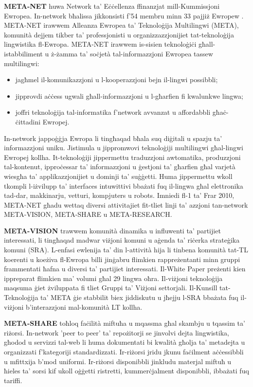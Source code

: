 \begin{multicols}{2}

\textbf{META-NET} huwa Network ta’ Eċċellenza ffinanzjat mill-Kummissjoni Ewropea. In-network bħalissa jikkonsisti f’54 membru minn 33 pajjiż Ewropew \cite{rehm2011}. META-NET irawwem Alleanza Ewropea ta’ Teknoloġija Multilingwi (META), komunità dejjem tikber ta’ professjonisti u organizzazzjonijiet tat-teknoloġija lingwistika fl-Ewropa. META-NET irawwem is-sisien teknoloġiċi għall-istabbiliment u ż-żamma ta’ soċjetà tal-informazzjoni Ewropea tassew multilingwi:

\begin{itemize}
\item jagħmel il-komunikazzjoni u l-kooperazzjoni bejn il-lingwi possibbli;
\item jipprovdi aċċess ugwali għall-informazzjoni u l-għarfien fi kwalunkwe lingwa;
\item joffri teknoloġija tal-informatika f’network avvanzat u affordabbli  għaċ-ċittadini Ewropej.  
\end{itemize}

In-network jappoġġja Ewropa li tingħaqad bħala suq diġitali u spazju ta’ informazzjoni uniku. Jistimula u jippromwovi teknoloġiji multilingwi għal-lingwi Ewropej kollha. It-teknoloġiji jippermettu traduzzjoni awtomatika, produzzjoni tal-kontenut, ipproċessar ta’ informazzjoni u ġestjoni ta’ għarfien għal varjetà wiesgħa ta’ applikazzjonijiet u dominji ta’ suġġetti. Huma jippermettu wkoll tkompli l-iżvilupp ta’ interfaces intuwittivi bbażati fuq il-lingwa għal elettronika tad-dar, makkinarju, vetturi, kompjuters u robots.
Imniedi fl-1 ta’ Frar 2010, META-NET għadu wettaq diversi attivitajiet fit-tliet linji ta’ azzjoni tan-network META-VISION, META-SHARE u META-RESEARCH.

\textbf{META-VISION} trawwem komunità dinamika u influwenti ta’ partijiet interessati, li tingħaqad madwar viżjoni komuni u aġenda ta’ riċerka strateġika komuni (SRA). L-enfasi ewlenija ta’ din l-attività hija li tinbena komunità tat-TL koerenti u koeżiva fl-Ewropa billi jinġabru flimkien rappreżentanti minn gruppi frammentati ħafna u diversi ta' partijiet interessati. Il-White Paper preżenti kien ippreparat flimkien ma’ volumi għal 29 lingwa oħra. Il-viżjoni teknoloġija maqsuma ġiet żviluppata fi tliet Gruppi ta’ Viżjoni settorjali. Il-Kunsill tat-Teknoloġija ta’ META ġie stabbilit biex jiddiskutu u jħejju l-SRA bbażata fuq il-viżjoni b’interazzjoni mal-komunità LT kollha.

\textbf{META-SHARE} toħloq faċilità miftuħa u mqassma għal skambju u tqassim ta’ riżorsi. In-network 'peer to peer' ta’ repożitorji se jinvolvi dejta lingwistika, għodod u servizzi tal-web li huma dokumentati bi kwalità għolja ta’ metadejta u organizzati f’kategoriji standardizzati. Ir-riżorsi jridu jkunu faċilment aċċessibbli u mfittxija b’mod uniformi. Ir-riżorsi disponibbli jinkludu materjal miftuħ u ħieles ta’ sorsi kif ukoll oġġetti ristretti, kummerċjalment disponibbli, ibbażati fuq tariffi. 


\end{multicols}
